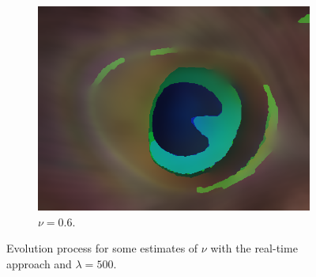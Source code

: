 \documentclass[abstracton]{scrreprt}
\begin{document}
\begin{figure}[!ht]
\begin{subfigure}[b]{0.16\textwidth}
                    \includegraphics[width=\textwidth]{img/segmentation/rt/06peacock-feather.png}
                    \caption{$\nu = 0.6$.}
                \end{subfigure}
                \caption[Evolution process for image segmentation with real-time Mumford-Shah.]{Evolution process for some estimates of $\nu$ with the real-time approach and $\lambda = 500$.}
            \label{fig:segmentation_evolution_test_images_rt}
            \end{figure}
\end{document}
